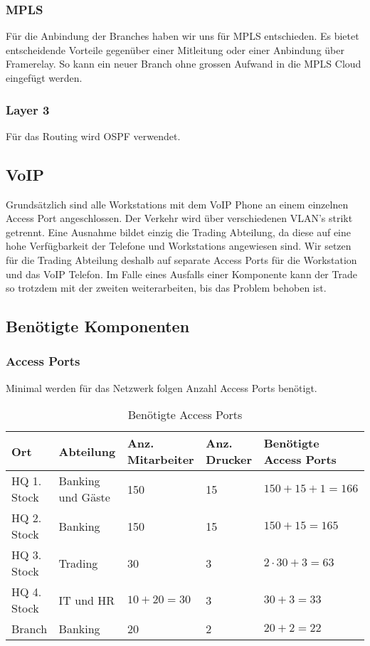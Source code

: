 \subsubsection{MPLS}
Für die Anbindung der Branches haben wir uns für MPLS entschieden. Es bietet entscheidende Vorteile gegenüber einer Mitleitung oder einer Anbindung über Framerelay. So kann ein neuer Branch ohne grossen Aufwand in die MPLS Cloud eingefügt werden.

\subsubsection{Layer 3}
Für das Routing wird OSPF verwendet.

\subsection{VoIP}
Grundsätzlich sind alle Workstations mit dem VoIP Phone an einem einzelnen Access Port angeschlossen. Der Verkehr wird über verschiedenen VLAN's strikt getrennt. Eine Ausnahme bildet einzig die Trading Abteilung, da diese auf eine hohe Verfügbarkeit der Telefone und Workstations angewiesen sind. Wir setzen für die Trading Abteilung deshalb auf separate Access Ports für die Workstation und das VoIP Telefon. Im Falle eines Ausfalls einer Komponente kann der Trade so trotzdem mit der zweiten weiterarbeiten, bis das Problem behoben ist.

\subsection{Benötigte Komponenten}
\subsubsection{Access Ports}
Minimal werden für das Netzwerk folgen Anzahl Access Ports benötigt. 
\begin{table}[h]
	\centering
	\begin{tabu} to \linewidth {l l l l l}
		\toprule 
		Ort & Abteilung & Anz. Mitarbeiter & Anz. Drucker & Benötigte Access Ports \\
		\midrule
		HQ 1. Stock & Banking und Gäste & 150 & 15 & $150 + 15 + 1 = 166$ \\ 
		HQ 2. Stock & Banking & 150 & 15 & $150 + 15 = 165$ \\
		HQ 3. Stock & Trading & 30 & 3 & $2 \cdot 30 + 3 = 63$ \\ 
		HQ 4. Stock & IT und HR & $10 + 20 = 30$ & 3 & $30 + 3 = 33$\\
		Branch  & Banking & 20 & 2 & $20 + 2 = 22$\\
		\bottomrule 
	\end{tabu} 
	\label{tbl:require_access_ports}
	\caption{Benötigte Access Ports}
\end{table}

